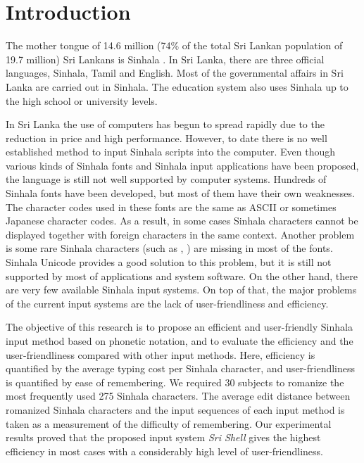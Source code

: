 \documentclass[english]{jnlp_1.3e}
\begin{document}
\maketitle

\section{Introduction}

The mother tongue of 14.6 million (74\% of the total Sri Lankan population of 19.7 million) Sri Lankans is Sinhala \cite{population}. 
In Sri Lanka, there are three official languages,  Sinhala, Tamil and English.
Most of the governmental affairs in Sri Lanka are carried out in  Sinhala. 
The education system also uses  Sinhala up to the  high school or university  levels. 

In Sri Lanka the use of computers has begun to spread  rapidly due  to the reduction in price and high performance. 
 However,  to date there is no well established method to input Sinhala scripts into the computer. 
Even though various kinds of Sinhala  fonts  and Sinhala input applications have been proposed,  the language is still not  well supported by computer systems.
Hundreds of Sinhala fonts have been developed, but most of them have their own weaknesses. 
The character codes used in these fonts are  the  same as ASCII or sometimes Japanese character codes. 
As a result, in some cases Sinhala characters cannot be displayed together with foreign characters in the same context. Another problem is some rare Sinhala characters (such as {\SHa{}}  ,{\SHa{}} ) are missing in most of the fonts. 
 Sinhala Unicode provides a good solution to this problem, but it is still not supported by most  of applications and system software. 
 On the other hand, there are very few available Sinhala input systems. 
On top of that, the major problems of the current input systems are the lack of user-friendliness and efficiency. 

The objective of this research is to propose an efficient and user-friendly Sinhala input method based on phonetic notation, and to evaluate the efficiency and the user-friendliness compared with other input methods. 
Here, efficiency is quantified by the average typing cost  per Sinhala  character, and user-friendliness is quantified by ease of remembering. 
We required 30 subjects to romanize the most frequently used 275 Sinhala characters. 
The average edit distance between romanized Sinhala characters and the input sequences of each input method is taken as a measurement of  the  difficulty of remembering. Our  experimental  results proved  that the  proposed input system {\it Sri Shell} gives the highest efficiency in most cases with a considerably high level of user-friendliness.
\end{document}
